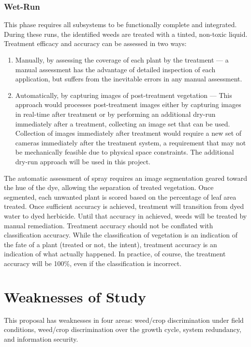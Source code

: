 \documentclass[12pt]{article}
\begin{document}
{\subsubsection{Wet-Run} 
This phase requires all subsystems to be functionally complete and integrated. During these runs, the identified weeds are treated with a tinted, non-toxic liquid.  Treatment efficacy and accuracy can be assessed in two ways:
\begin{enumerate}
	\item{Manually, by assessing the coverage of each plant by the treatment --- a manual assessment has the advantage of detailed inspection of each application, but suffers from the inevitable errors in any manual assessment.}
	\item{Automatically, by capturing images of post-treatment vegetation --- This approach would processes post-treatment images either by capturing images in real-time after treatment or by performing an additional dry-run immediately after a treatment, collecting an image set that can be used.  Collection of images immediately after treatment would require a new set of cameras immediately after the treatment system, a requirement that may not be mechanically feasible due to physical space constraints. The additional dry-run approach will be used in this project.}
\end{enumerate}
The automatic assessment of spray requires an image segmentation geared toward the hue of the dye, allowing the separation of treated vegetation. Once segmented, each unwanted plant is scored based on the percentage of leaf area treated. Once sufficient accuracy is achieved, treatment will transition from dyed water to dyed herbicide. Until that accuracy in achieved, weeds will be treated by manual remediation. Treatment accuracy should not be conflated with classification accuracy. While the classification of vegetation is an indication of the fate of a plant (treated or not, the intent), treatment accuracy is an indication of what actually happened. In practice, of course, the treatment accuracy will be 100\%, even if the classification is incorrect.


 \newpage
%
%
\section{Weaknesses of Study}
This proposal has weaknesses in four areas: weed/crop discrimination under field conditions, weed/crop discrimination over the growth cycle, system redundancy, and information security.

}
\end{document}
